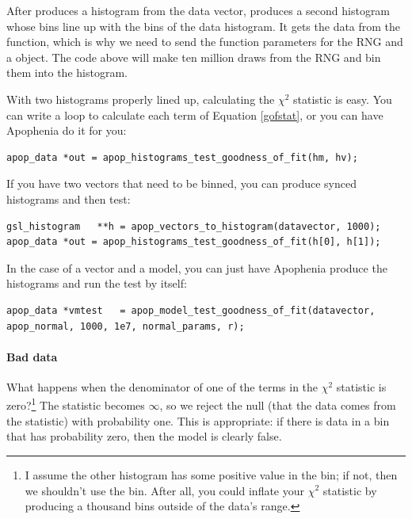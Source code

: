 After  produces a histogram from the
data vector,  produces a second histogram
whose bins line up with the bins of the data histogram. It gets the data
from the  function, which is why we need to
send the function parameters for the RNG and a 
object. The code above will make ten million draws from the RNG and bin
them into the  histogram.

With two histograms properly lined up, calculating the $\chi^2$
statistic is easy. You can write a  loop to calculate each
term of Equation \ref{gofstat}, or you can have Apophenia do it for you:
\begin{lstlisting}
apop_data *out = apop_histograms_test_goodness_of_fit(hm, hv);
\end{lstlisting}


If you have two vectors that need to be binned, you can produce 
synced histograms and then test:
\begin{lstlisting}
gsl_histogram   **h = apop_vectors_to_histogram(datavector, 1000);
apop_data *out = apop_histograms_test_goodness_of_fit(h[0], h[1]);
\end{lstlisting}
In the case of a vector and a model, you can just have
Apophenia produce the histograms and run the test by itself:
\begin{lstlisting}
apop_data *vmtest   = apop_model_test_goodness_of_fit(datavector, apop_normal, 1000, 1e7, normal_params, r);
\end{lstlisting}


\paragraph{\treesymbol Bad data} What happens when the denominator of
one of the terms in the $\chi^2$ statistic is zero?\footnote{I assume
the other histogram has some positive value in the bin; if not, then
we shouldn't use the bin. After all, you could inflate your $\chi^2$
statistic by producing a thousand bins outside of the data's range.} The
statistic becomes $\infty$, so we reject the null (that the data comes
from the statistic) with probability one. This is appropriate: if there is
data in a bin that has probability zero, then the model is clearly false.

